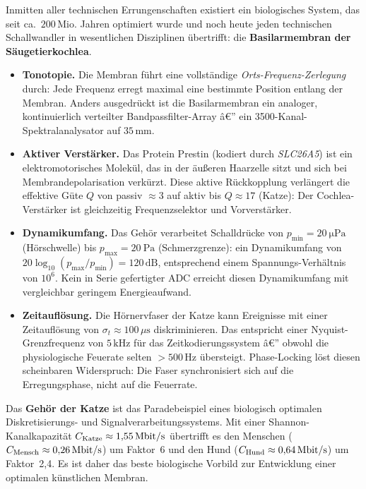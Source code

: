 ﻿\documentclass[12pt,a4paper,titlepage]{report}
\begin{document}
Inmitten aller technischen Errungenschaften existiert ein biologisches System,
das seit ca.\ $200\,\mathrm{Mio.}$ Jahren optimiert wurde und noch heute
jeden technischen Schallwandler in wesentlichen Disziplinen übertrifft:
die \textbf{Basilarmembran der Säugetierkochlea}.

\begin{itemize}[leftmargin=2em]
	\item \textbf{Tonotopie.}
		Die Membran führt eine vollständige \emph{Orts-Frequenz-Zerlegung}
		durch: Jede Frequenz erregt maximal eine bestimmte Position
		entlang der Membran.
		Anders ausgedrückt ist die Basilarmembran ein analoger,
		kontinuierlich verteilter Bandpassfilter-Array â€”
		ein 3500-Kanal-Spektralanalysator auf $35\,\mathrm{mm}$.
	\item \textbf{Aktiver Verstärker.}
		Das Protein Prestin (kodiert durch \textit{SLC26A5}) ist ein
		elektromotorisches Molekül, das in der äußeren Haarzelle sitzt
		und sich bei Membrandepolarisation verkürzt.
		Diese aktive Rückkopplung verlängert die effektive Güte $Q$
		von passiv $\approx 3$ auf aktiv bis $Q\approx17$ (Katze):
		Der Cochlea-Verstärker ist gleichzeitig
		Frequenzselektor und Vorverstärker.
	\item \textbf{Dynamikumfang.}
		Das Gehör verarbeitet Schalldrücke von
		$p_{\min}=\SI{20}{\micro\pascal}$ (Hörschwelle) bis
		$p_{\max}=\SI{20}{\pascal}$ (Schmerzgrenze):
		ein Dynamikumfang von
		$20\log_{10}(p_{\max}/p_{\min}) = 120\,\mathrm{dB}$,
		entsprechend einem Spannungs-Verhältnis von $10^6$.
		Kein in Serie gefertigter ADC erreicht diesen Dynamikumfang
		mit vergleichbar geringem Energieaufwand.
	\item \textbf{Zeitauflösung.}
		Die Hörnervfaser der Katze kann Ereignisse mit einer
		Zeitauflösung von $\sigma_t \approx 100\,\mu\mathrm{s}$
		diskriminieren.
		Das entspricht einer Nyquist-Grenzfrequenz von $5\,\mathrm{kHz}$
		für das Zeitkodierungssystem â€” obwohl die physiologische
		Feuerate selten $> 500\,\mathrm{Hz}$ übersteigt.
		Phase-Locking löst diesen scheinbaren Widerspruch:
		Die Faser synchronisiert sich auf die Erregungsphase,
		nicht auf die Feuerrate.
\end{itemize}

Das \textbf{Gehör der Katze} ist das Paradebeispiel eines
biologisch optimalen Diskretisierungs- und Signalverarbeitungssystems.
Mit einer Shannon-Kanalkapazität $C_{\rm Katze}\approx1{,}55\,\mathrm{Mbit / s}$
übertrifft es den Menschen ($C_{\rm Mensch}\approx0{,}26\,\mathrm{Mbit/s}$)
um Faktor~6 und den Hund ($C_{\rm Hund}\approx0{,}64\,\mathrm{Mbit/s}$)
um Faktor~2{,}4.
Es ist daher das beste biologische Vorbild zur Entwicklung
einer optimalen künstlichen Membran.
\end{document}
